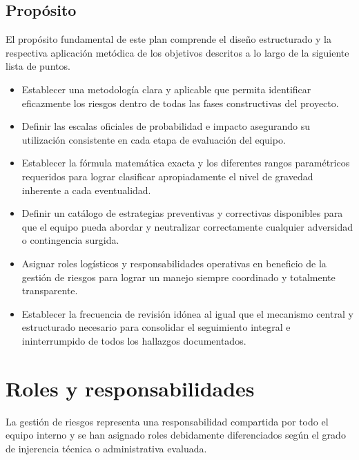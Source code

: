 \documentclass[11pt,spanish]{article}
\begin{document}
\subsection{Propósito}

El propósito fundamental de este plan comprende el diseño estructurado y la respectiva aplicación metódica de los objetivos descritos a lo largo de la siguiente lista de puntos.

\begin{itemize}
    \item Establecer una metodología clara y aplicable que permita identificar eficazmente los riesgos dentro de todas las fases constructivas del proyecto.
    \item Definir las escalas oficiales de probabilidad e impacto asegurando su utilización consistente en cada etapa de evaluación del equipo.
    \item Establecer la fórmula matemática exacta y los diferentes rangos paramétricos requeridos para lograr clasificar apropiadamente el nivel de gravedad inherente a cada eventualidad.
    \item Definir un catálogo de estrategias preventivas y correctivas disponibles para que el equipo pueda abordar y neutralizar correctamente cualquier adversidad o contingencia surgida.
    \item Asignar roles logísticos y responsabilidades operativas en beneficio de la gestión de riesgos para lograr un manejo siempre coordinado y totalmente transparente.
    \item Establecer la frecuencia de revisión idónea al igual que el mecanismo central y estructurado necesario para consolidar el seguimiento integral e ininterrumpido de todos los hallazgos documentados.
\end{itemize}

\section{Roles y responsabilidades}

La gestión de riesgos representa una responsabilidad compartida por todo el equipo interno y se han asignado roles debidamente diferenciados según el grado de injerencia técnica o administrativa evaluada.
\end{document}
